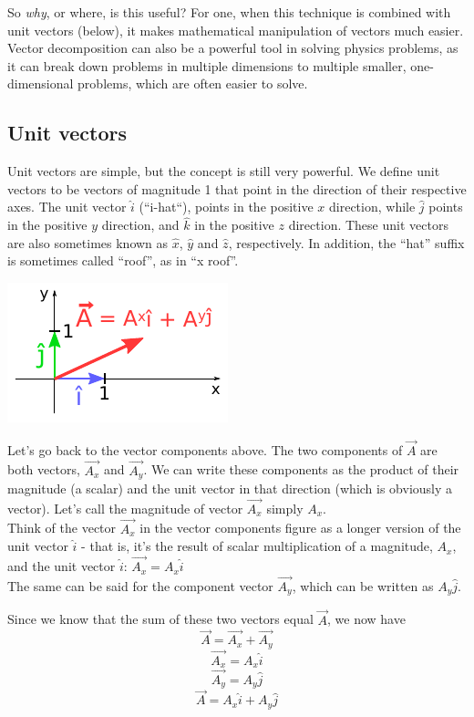 \documentclass[12pt,a4paper]{report}
\begin{document}
So \emph{why}, or where, is this useful? For one, when this technique is combined with unit vectors (below), it makes mathematical manipulation of vectors much easier. Vector decomposition can also be a powerful tool in solving physics problems, as it can break down problems in multiple dimensions to multiple smaller, one-dimensional problems, which are often easier to solve.


\subsection{Unit vectors}
Unit vectors are simple, but the concept is still very powerful. We define unit vectors to be vectors of magnitude 1 that point in the direction of their respective axes. The unit vector $\hat{i}$ (``i-hat``), points in the positive $x$ direction, while $\hat{j}$ points in the positive $y$ direction, and $\hat{k}$ in the positive $z$ direction. These unit vectors are also sometimes known as $\hat{x}$, $\hat{y}$ and $\hat{z}$, respectively. In addition, the ``hat'' suffix is sometimes called ``roof'', as in ``x roof''.

\includegraphics[scale=1.6]{Graphics/vectors/unitvectors}

Let's go back to the vector components above. The two components of $\vec{A}$ are both vectors, $\vec{A_x}$ and $\vec{A_y}$. We can write these components as the product of their magnitude (a scalar) and the unit vector in that direction (which is obviously a vector). Let's call the magnitude of vector $\vec{A_x}$  simply $A_x$.\\
Think of the vector $\vec{A_x}$ in the vector components figure as a longer version of the unit vector $\hat{i}$ - that is, it's the result of scalar multiplication of a magnitude, $A_x$, and the unit vector $\hat{i}$: $\vec{A_x} = A_x \hat{i}$\\
The same can be said for the component vector $\vec{A_y}$, which can be written as $A_y \hat{j}$.

Since we know that the sum of these two vectors equal $\vec{A}$, we now have
\[ \vec{A} = \vec{A_x} + \vec{A_y} \]
\[ \vec{A_x} = A_x \hat{i} \]
\[ \vec{A_y} = A_y \hat{j} \]
\[ \vec{A} = A_x \hat{i} + A_y \hat{j} \]
\end{document}
